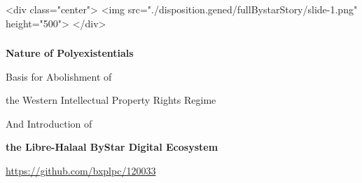 \begin{whenOrg}
\begin{htmlonly}

\begin{frame}[fragile,plain,label=fullBystarStory]
    \frametitle{}
    \framesubtitle{}
    \begin{rawhtml}
<div class="center">
<img src="./disposition.gened/fullBystarStory/slide-1.png" height="500">
</div>
    \end{rawhtml}
\end{frame}
\end{htmlonly}

\begin{verblatex}

\begin{frame}[fragile,plain,label=fullBystarStory]
    \frametitle{}
    \framesubtitle{}

\begin{center}
  {\huge \textbf{Nature of Polyexistentials}}
\end{center}


\begin{center}
  {\Large \colorbox{blue!50}{\color{white} Basis for Abolishment of}}
\end{center}

\begin{center}
  {\Large \colorbox{blue!50}{\color{white} the Western Intellectual Property Rights Regime}}
\end{center}


\begin{center}
  {\Large And Introduction of}
\end{center}

\begin{center}
  {\Large {\color{blue} \textbf{the Libre-Halaal ByStar Digital Ecosystem}}}
\end{center}


\begin{center}
 \href{https://github.com/bxplpc/120033}{https://github.com/bxplpc/120033}
\end{center}

\begin{center}
\vspace{0.2in}
\end{center}



\end{frame}
\end{verblatex}
\end{whenOrg}
